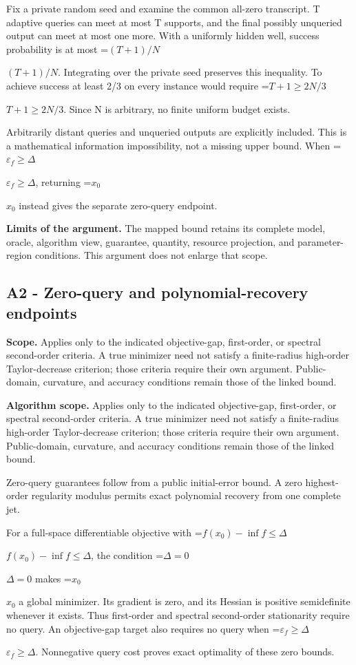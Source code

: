 \documentclass[10pt,a4paper]{article}
\newcommand{\AtlasMath}[1]{\par\begingroup\centering\setbox0=\hbox{$\displaystyle #1$}\ifdim\wd0>1.4\linewidth\typeout{ATLAS WIDE FORMULA: \the\wd0}\fi\ifdim\wd0>\linewidth\resizebox{\linewidth}{!}{\box0}\else\box0\fi\par\endgroup}
\newcommand{\AtlasInlineMath}[1]{\begingroup\setbox0=\hbox{$#1$}\ifdim\wd0>.4\linewidth\endgroup\AtlasMath{#1}\else\endgroup$#1$\fi}
\begin{document}
Fix a private random seed and examine the common all-zero transcript. T adaptive queries can meet at most T supports, and the final possibly unqueried output can meet at most one more. With a uniformly hidden well, success probability is at most \AtlasInlineMath{(T+1)/N}. Integrating over the private seed preserves this inequality. To achieve success at least 2/3 on every instance would require \AtlasInlineMath{T+1\ge2N/3}. Since N is arbitrary, no finite uniform budget exists.

Arbitrarily distant queries and unqueried outputs are explicitly included. This is a mathematical information impossibility, not a missing upper bound. When \AtlasInlineMath{\varepsilon_f\ge\Delta}, returning \AtlasInlineMath{x_0} instead gives the separate zero-query endpoint.

\textbf{Limits of the argument.} The mapped bound retains its complete model, oracle, algorithm view, guarantee, quantity, resource projection, and parameter-region conditions. This argument does not enlarge that scope.

\subsection{A2 - Zero-query and polynomial-recovery endpoints}
\textbf{Scope.} Applies only to the indicated objective-gap, first-order, or spectral second-order criteria. A true minimizer need not satisfy a finite-radius high-order Taylor-decrease criterion; those criteria require their own argument. Public-domain, curvature, and accuracy conditions remain those of the linked bound.

\textbf{Algorithm scope.} Applies only to the indicated objective-gap, first-order, or spectral second-order criteria. A true minimizer need not satisfy a finite-radius high-order Taylor-decrease criterion; those criteria require their own argument. Public-domain, curvature, and accuracy conditions remain those of the linked bound.

Zero-query guarantees follow from a public initial-error bound. A zero highest-order regularity modulus permits exact polynomial recovery from one complete jet.

For a full-space differentiable objective with \AtlasInlineMath{f(x_0)-\inf f\le\Delta}, the condition \AtlasInlineMath{\Delta=0} makes \AtlasInlineMath{x_0} a global minimizer. Its gradient is zero, and its Hessian is positive semidefinite whenever it exists. Thus first-order and spectral second-order stationarity require no query. An objective-gap target also requires no query when \AtlasInlineMath{\varepsilon_f\ge\Delta}. Nonnegative query cost proves exact optimality of these zero bounds.
\end{document}
